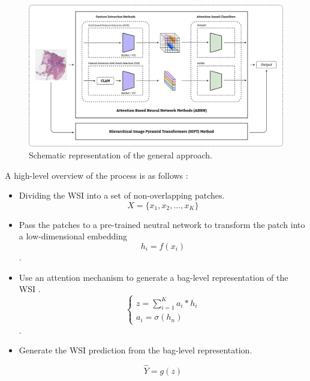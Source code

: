 \documentclass[
11pt, %
english, %
singlespacing, %
headsepline, %
]{project_structure}
\begin{document}
\begin{figure}[H]
    \centering
    \includegraphics[width=\textwidth]{figures/approach.png}
    \caption{Schematic representation of the general approach.}
    \label{fig:approach}
\end{figure}

\noindent A high-level overview of the process is as follows :

\begin{itemize}
    \item Dividing the \acrshort{WSI} into a set of non-overlapping patches.
    $$
        X = \{x_{1},x_{2},...,x_{K}\}
    $$
    \item Pass the patches to a pre-trained neutral network to transform the patch into a low-dimensional embedding     
    $$
        h_{i} = f(x_{i})
    $$.
    \item Use an attention mechanism to generate a bag-level representation of the \acrshort{WSI} .
    $$
        \begin{cases}
            z = \sum\limits_{i=1}^{K} a_{i} * h_{i}\\
            a_{i} = \sigma(h_{n})
        \end{cases}
    $$.
    \item Generate the \acrshort{WSI} prediction from the bag-level representation.

    $$
        \hat{Y} = g(z)
    $$
    
\end{itemize}
\end{document}
